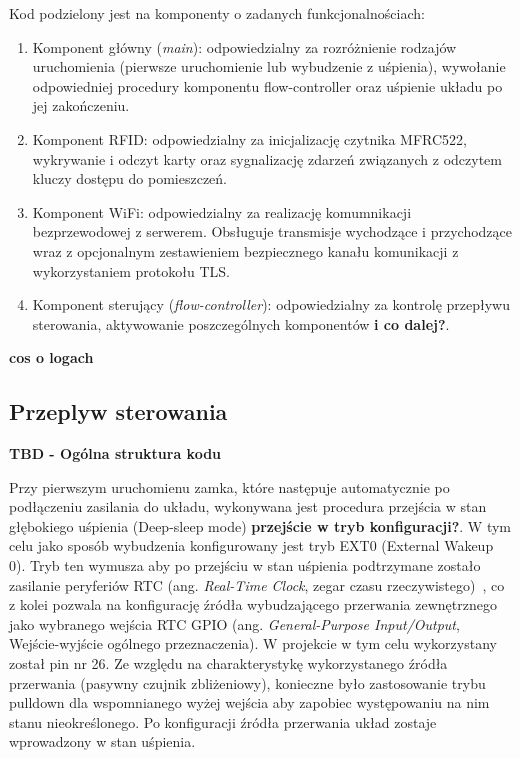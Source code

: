             Kod podzielony jest na komponenty o zadanych funkcjonalnościach:
            \begin{enumerate}
                \item Komponent główny (\textit{main}): odpowiedzialny za rozróżnienie rodzajów uruchomienia (pierwsze uruchomienie lub wybudzenie z uśpienia), wywołanie odpowiedniej procedury komponentu flow-controller oraz uśpienie układu po jej zakończeniu.
                \item Komponent RFID: odpowiedzialny za inicjalizację czytnika MFRC522, wykrywanie i odczyt karty oraz sygnalizację zdarzeń związanych z odczytem kluczy dostępu do pomieszczeń.
                \item Komponent WiFi: odpowiedzialny za realizację komumnikacji bezprzewodowej z serwerem. Obsługuje transmisje wychodzące i przychodzące wraz z opcjonalnym zestawieniem bezpiecznego kanału komunikacji z wykorzystaniem protokołu TLS.
                \item Komponent sterujący (\textit{flow-controller}): odpowiedzialny za kontrolę przepływu sterowania, aktywowanie poszczególnych komponentów \textbf{i co dalej?}.
            \end{enumerate}
            \textbf{cos o logach}

        \subsection{Przeplyw sterowania}

            \textbf{TBD - Ogólna struktura kodu}

            Przy pierwszym uruchomienu zamka, które następuje automatycznie po podłączeniu zasilania do układu, wykonywana jest procedura przejścia w stan głębokiego uśpienia (Deep-sleep mode) \textbf{przejście w tryb konfiguracji?}. W tym celu jako sposób wybudzenia konfigurowany jest tryb EXT0 (External Wakeup 0). Tryb ten wymusza aby po przejściu w stan uśpienia podtrzymane zostało zasilanie peryferiów RTC (ang. \textit{Real-Time Clock}, zegar czasu rzeczywistego)~\cite{esp32-api-ref-deep-sleep}, co z kolei pozwala na konfigurację źródła wybudzającego przerwania zewnętrznego jako wybranego wejścia RTC GPIO (ang. \textit{General-Purpose Input/Output}, Wejście-wyjście ogólnego przeznaczenia). W projekcie w tym celu wykorzystany został pin nr 26. Ze względu na charakterystykę wykorzystanego źródła przerwania (pasywny czujnik zbliżeniowy), konieczne było zastosowanie trybu pulldown dla wspomnianego wyżej wejścia aby zapobiec występowaniu na nim stanu nieokreślonego. Po konfiguracji źródła przerwania układ zostaje wprowadzony w stan uśpienia.

